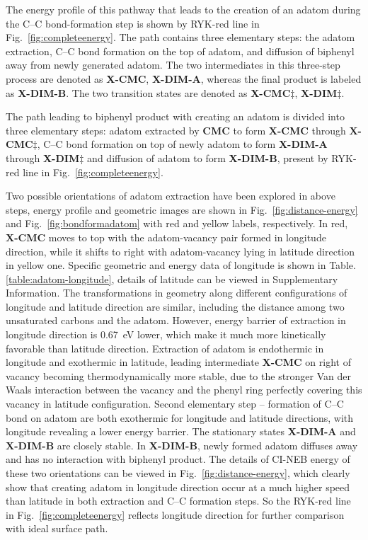 \documentclass[%
 reprint,
 amsmath,amssymb,
 aps,
prb,
floatfix,
]{revtex4-2}
\newcommand{\lock}{\color{red}}
\newcommand{\lock}{\color{red}}
\newcommand{\sinfo}{Supplementary Information}
\begin{document}
{\lock
The energy profile of this pathway that leads to the creation of an adatom during the C--C bond-formation step is shown by RYK-red line in Fig.~\ref{fig:completeenergy}. The path contains three elementary steps: the adatom extraction, C--C bond formation on the top of adatom, and diffusion of biphenyl away from newly generated adatom. The two intermediates in this three-step process are denoted as \textbf{X-CMC}, \textbf{X-DIM-A}, whereas the final product is labeled as \textbf{X-DIM-B}. The two transition states are denoted as \textbf{X-CMC$\ddagger$}, \textbf{X-DIM$\ddagger$}.
}

{\color{blue}
The path leading to biphenyl product with creating an adatom is divided into three elementary steps: adatom extracted by \textbf{CMC} to form \textbf{X-CMC} through \textbf{X-CMC$\ddagger$}, C--C bond formation on top of newly adatom to form \textbf{X-DIM-A} through \textbf{X-DIM$\ddagger$} and diffusion of adatom to form \textbf{X-DIM-B}, present by RYK-red line in Fig.~\ref{fig:completeenergy}.

Two possible orientations of adatom extraction have been explored in above steps, energy profile and geometric images are shown in Fig.~\ref{fig:distance-energy} and Fig.~\ref{fig:bondformadatom} with red and yellow labels, respectively. In red, \textbf{X-CMC} moves to top with the adatom-vacancy pair formed in longitude direction, while it shifts to right with adatom-vacancy lying in latitude direction in yellow one. Specific geometric and energy data of longitude is shown in Table.\ref{table:adatom-longitude}, details of latitude can be viewed in \sinfo. The transformations in geometry along different configurations of longitude and latitude direction are similar, including the distance among two unsaturated carbons and the adatom. However, energy barrier of extraction in longitude direction is \SI{0.67}{\electronvolt} lower, which make it much more kinetically favorable than latitude direction. Extraction of adatom is endothermic in longitude and exothermic in latitude, leading intermediate \textbf{X-CMC} on right of vacancy becoming thermodynamically more stable, due to the stronger Van der Waals interaction between the vacancy and the phenyl ring perfectly covering this vacancy in latitude configuration. Second elementary step -- formation of C--C bond on adatom are both exothermic for longitude and latitude directions, with longitude revealing a lower energy barrier. The stationary states \textbf{X-DIM-A} and \textbf{X-DIM-B} are closely stable. In \textbf{X-DIM-B}, newly formed adatom diffuses away and has no interaction with biphenyl product. The details of CI-NEB energy of these two orientations can be viewed in Fig.~\ref{fig:distance-energy}, which clearly show that creating adatom in longitude direction occur at a much higher speed than latitude in both extraction and C--C formation steps. So the RYK-red line in Fig.~\ref{fig:completeenergy} reflects longitude direction for further comparison with ideal surface path.

}
\end{document}
